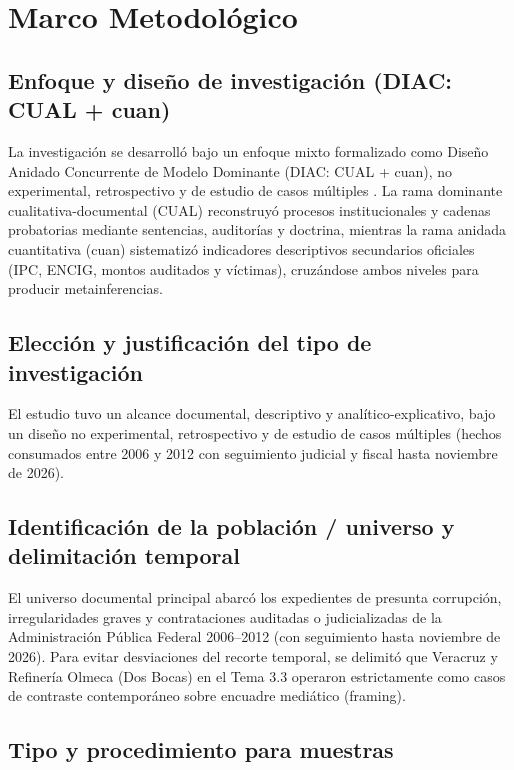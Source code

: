 \documentclass[12pt,letterpaper,oneside]{article}
\begin{document}
\clearpage

\section{Marco Metodológico}

\subsection{Enfoque y diseño de investigación (DIAC: CUAL + cuan)}

La investigación se desarrolló bajo un enfoque mixto formalizado como Diseño Anidado Concurrente de Modelo Dominante (DIAC: CUAL + cuan), no experimental, retrospectivo y de estudio de casos múltiples \citep{hernandez2014}. La rama dominante cualitativa-documental (CUAL) reconstruyó procesos institucionales y cadenas probatorias mediante sentencias, auditorías y doctrina, mientras la rama anidada cuantitativa (cuan) sistematizó indicadores descriptivos secundarios oficiales (IPC, ENCIG, montos auditados y víctimas), cruzándose ambos niveles para producir metainferencias.

\subsection{Elección y justificación del tipo de investigación}

El estudio tuvo un alcance documental, descriptivo y analítico-explicativo, bajo un diseño no experimental, retrospectivo y de estudio de casos múltiples (hechos consumados entre 2006 y 2012 con seguimiento judicial y fiscal hasta noviembre de 2026).

\subsection{Identificación de la población / universo y delimitación temporal}

El universo documental principal abarcó los expedientes de presunta corrupción, irregularidades graves y contrataciones auditadas o judicializadas de la Administración Pública Federal 2006--2012 (con seguimiento hasta noviembre de 2026). Para evitar desviaciones del recorte temporal, se delimitó que Veracruz y Refinería Olmeca (Dos Bocas) en el Tema 3.3 operaron estrictamente como casos de contraste contemporáneo sobre encuadre mediático (framing).

\subsection{Tipo y procedimiento para muestras}
\end{document}
